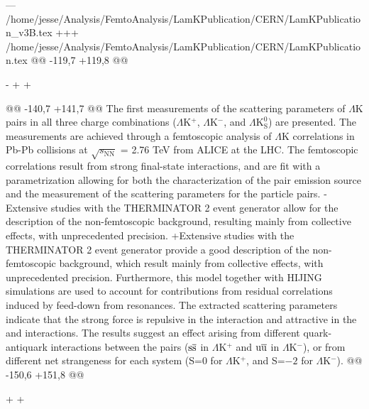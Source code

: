 --- /home/jesse/Analysis/FemtoAnalysis/LamKPublication/CERN/LamKPublication_v3B.tex
+++ /home/jesse/Analysis/FemtoAnalysis/LamKPublication/CERN/LamKPublication.tex
@@ -119,7 +119,8 @@
 
 
-%
+%
+%
 \begin{titlepage}
@@ -140,7 +141,7 @@
 The first measurements of the scattering parameters of $\Lambda$K pairs in all three charge combinations ($\Lambda$K$^{+}$, $\Lambda$K$^{-}$, and $\Lambda\mathrm{K^{0}_{S}}$) are presented.
 The measurements are achieved through a femtoscopic analysis of $\Lambda$K correlations in Pb-Pb collisions at $\sqrt{s_{\mathrm{NN}}}$ = 2.76 TeV from ALICE at the LHC.  
 The femtoscopic correlations result from strong final-state interactions, and are fit with a parametrization allowing for both the characterization of the pair emission source and the measurement of the scattering parameters for the particle pairs.
-Extensive studies with the THERMINATOR 2 event generator allow for the description of the non-femtoscopic background, resulting mainly from collective effects, with unprecedented precision.
+Extensive studies with the THERMINATOR 2 event generator provide a good description of the non-femtoscopic background, which result mainly from collective effects, with unprecedented precision.
 Furthermore, this model together with HIJING simulations are used to account for contributions from residual correlations induced by feed-down from resonances.
 The extracted scattering parameters indicate that the strong force is repulsive in the \LamKchP interaction and attractive in the \LamKchM and \LamKs interactions.
 The results suggest an effect arising from different quark-antiquark interactions between the pairs ($\rm s\overline{s}$ in $\Lambda$K$^{+}$ and $\rm u\overline{u}$ in $\Lambda$K$^{-}$), or from different net strangeness for each system (S=0 for $\Lambda$K$^{+}$, and S=$-2$ for $\Lambda$K$^{-}$).
@@ -150,6 +151,8 @@
 \end{titlepage}
 \setcounter{page}{2}
 
+%
+%
